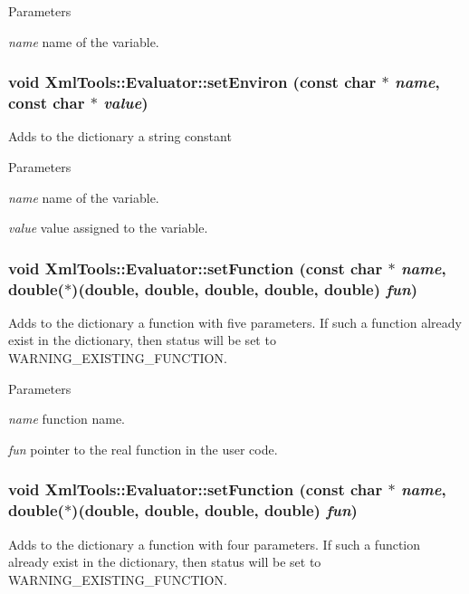 \begin{DoxyParams}{Parameters}
\item[{\em name}]name of the variable. \end{DoxyParams}
\hypertarget{class_xml_tools_1_1_evaluator_a3329d0bef31237642ed7d5ca53d9d167}{
\subsubsection[{setEnviron}]{\setlength{\rightskip}{0pt plus 5cm}void XmlTools::Evaluator::setEnviron (const char $\ast$ {\em name}, \/  const char $\ast$ {\em value})}}
\label{class_xml_tools_1_1_evaluator_a3329d0bef31237642ed7d5ca53d9d167}
Adds to the dictionary a string constant


\begin{DoxyParams}{Parameters}
\item[{\em name}]name of the variable. \item[{\em value}]value assigned to the variable. \end{DoxyParams}
\hypertarget{class_xml_tools_1_1_evaluator_ad4808f32cfac966a6ee400acaf7ff3ca}{
\subsubsection[{setFunction}]{\setlength{\rightskip}{0pt plus 5cm}void XmlTools::Evaluator::setFunction (const char $\ast$ {\em name}, \/  double($\ast$)(double, double, double, double, double) {\em fun})}}
\label{class_xml_tools_1_1_evaluator_ad4808f32cfac966a6ee400acaf7ff3ca}
Adds to the dictionary a function with five parameters. If such a function already exist in the dictionary, then status will be set to WARNING\_\-EXISTING\_\-FUNCTION.


\begin{DoxyParams}{Parameters}
\item[{\em name}]function name. \item[{\em fun}]pointer to the real function in the user code. \end{DoxyParams}
\hypertarget{class_xml_tools_1_1_evaluator_a7e77831c7bca5fd7bb81d31b657844d1}{
\subsubsection[{setFunction}]{\setlength{\rightskip}{0pt plus 5cm}void XmlTools::Evaluator::setFunction (const char $\ast$ {\em name}, \/  double($\ast$)(double, double, double, double) {\em fun})}}
\label{class_xml_tools_1_1_evaluator_a7e77831c7bca5fd7bb81d31b657844d1}
Adds to the dictionary a function with four parameters. If such a function already exist in the dictionary, then status will be set to WARNING\_\-EXISTING\_\-FUNCTION.


